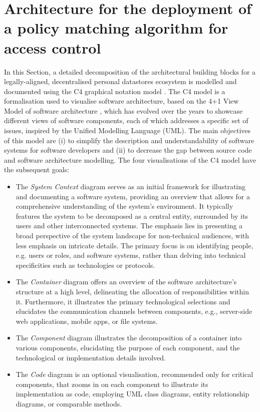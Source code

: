 \section{Architecture for the deployment of a policy matching algorithm for access control}
\label{sec:architecture}

In this Section, a detailed decomposition of the architectural building blocks for a legally-aligned, decentralised personal datastores ecosystem is modelled and documented using the C4 graphical notation model \citep{brown_c4_2015}.
The C4 model is a formalisation used to visualise software architecture, based on the 4+1 View Model of software architecture \citep{kruchten_41_1995}, which has evolved over the years to showcase different views of software components, each of which addresses a specific set of issues, inspired by the Unified Modelling Language (UML).
The main objectives of this model are (i) to simplify the description and understandability of software systems for software developers and (ii) to decrease the gap between source code and software architecture modelling.
The four visualisations of the C4 model have the subsequent goals:

\begin{itemize}
    \item The \textit{System Context} diagram serves as an initial framework for illustrating and documenting a software system, providing an overview that allows for a comprehensive understanding of the system's environment. It typically features the system to be decomposed as a central entity, surrounded by its users and other interconnected systems. The emphasis lies in presenting a broad perspective of the system landscape for non-technical audiences, with less emphasis on intricate details. The primary focus is on identifying people, e.g. users or roles, and software systems, rather than delving into technical specificities such as technologies or protocols.
    \item The \textit{Container} diagram offers an overview of the software architecture's structure at a high level, delineating the allocation of responsibilities within it. Furthermore, it illustrates the primary technological selections and elucidates the communication channels between components, e.g., server-side web applications, mobile apps, or file systems.
    \item The \textit{Component} diagram illustrates the decomposition of a container into various components, elucidating the purpose of each component, and the technological or implementation details involved.
    \item The \textit{Code} diagram is an optional visualisation, recommended only for critical components, that zooms in on each component to illustrate its implementation as code, employing UML class diagrams, entity relationship diagrams, or comparable methods.
\end{itemize}


